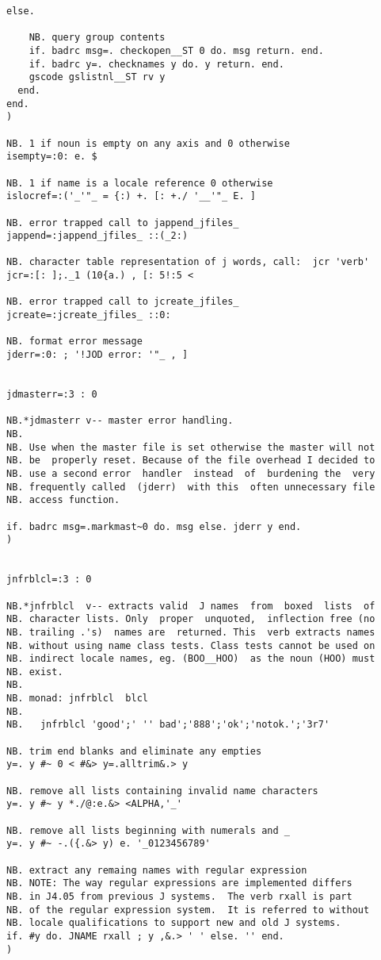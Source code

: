 \begin{lstlisting}[frame=single,framerule=0pt,basicstyle=\ttfamily\tiny]
  else.

    NB. query group contents
    if. badrc msg=. checkopen__ST 0 do. msg return. end.
    if. badrc y=. checknames y do. y return. end.
    gscode gslistnl__ST rv y
  end.
end.
)

NB. 1 if noun is empty on any axis and 0 otherwise
isempty=:0: e. $

NB. 1 if name is a locale reference 0 otherwise
islocref=:('_'"_ = {:) +. [: +./ '__'"_ E. ]

NB. error trapped call to jappend_jfiles_
jappend=:jappend_jfiles_ ::(_2:)

NB. character table representation of j words, call:  jcr 'verb'
jcr=:[: ];._1 (10{a.) , [: 5!:5 <

NB. error trapped call to jcreate_jfiles_
jcreate=:jcreate_jfiles_ ::0:

NB. format error message
jderr=:0: ; '!JOD error: '"_ , ]


jdmasterr=:3 : 0

NB.*jdmasterr v-- master error handling.
NB.
NB. Use when the master file is set otherwise the master will not
NB. be  properly reset. Because of the file overhead I decided to
NB. use a second error  handler  instead  of  burdening the  very
NB. frequently called  (jderr)  with this  often unnecessary file
NB. access function.

if. badrc msg=.markmast~0 do. msg else. jderr y end.
)


jnfrblcl=:3 : 0

NB.*jnfrblcl  v-- extracts valid  J names  from  boxed  lists  of
NB. character lists. Only  proper  unquoted,  inflection free (no
NB. trailing .'s)  names are  returned. This  verb extracts names
NB. without using name class tests. Class tests cannot be used on
NB. indirect locale names, eg. (BOO__HOO)  as the noun (HOO) must
NB. exist.
NB.
NB. monad: jnfrblcl  blcl
NB.
NB.   jnfrblcl 'good';' '' bad';'888';'ok';'notok.';'3r7'

NB. trim end blanks and eliminate any empties
y=. y #~ 0 < #&> y=.alltrim&.> y

NB. remove all lists containing invalid name characters
y=. y #~ y *./@:e.&> <ALPHA,'_'

NB. remove all lists beginning with numerals and _
y=. y #~ -.({.&> y) e. '_0123456789'

NB. extract any remaing names with regular expression
NB. NOTE: The way regular expressions are implemented differs
NB. in J4.05 from previous J systems.  The verb rxall is part
NB. of the regular expression system.  It is referred to without
NB. locale qualifications to support new and old J systems.
if. #y do. JNAME rxall ; y ,&.> ' ' else. '' end.
)


\end{lstlisting}
